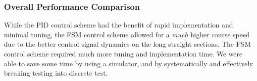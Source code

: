 \documentclass[letterpaper, 10 pt, conference]{ieeeconf}  %
\begin{document}
\subsubsection*{Overall Performance Comparison}
While the PID control scheme had the benefit of rapid implementation and minimal tuning, the FSM control scheme allowed for a \textit{much} higher course speed due to the better control signal dynamics on the long straight sections.  The FSM control scheme required much more tuning and implementation time.  We were able to save some time by using a simulator, and by systematically and effectively breaking testing into discrete test.


\addtolength{\textheight}{-12cm}   %
\end{document}
